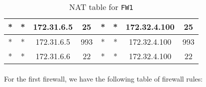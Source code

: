 \documentclass[a4paper, 11pt, oneside]{article}
\begin{document}
\begin{table}[H]
{\begin{tabular}{|cccc|cccc|}
    \multicolumn{1}{|c|}{*}                                      & \multicolumn{1}{c|}{*}                                           & \multicolumn{1}{c|}{172.31.6.5}                                  & 25                                                                    & \multicolumn{1}{c|}{*}                                      & \multicolumn{1}{c|}{*}                                           & \multicolumn{1}{c|}{{\color[HTML]{333333} 172.32.4.100}}         & 25                                                                    \\ \hline
    \multicolumn{1}{|c|}{*}                                      & \multicolumn{1}{c|}{*}                                           & \multicolumn{1}{c|}{172.31.6.5}                                  & {\color[HTML]{333333} 993}                                            & \multicolumn{1}{c|}{*}                                      & \multicolumn{1}{c|}{*}                                           & \multicolumn{1}{c|}{{\color[HTML]{333333} 172.32.4.100}}         & 993                                                                   \\ \hline
    \multicolumn{1}{|c|}{*}                                      & \multicolumn{1}{c|}{*}                                           & \multicolumn{1}{c|}{172.31.6.6}                                  & 22                                                                    & \multicolumn{1}{c|}{*}                                      & \multicolumn{1}{c|}{*}                                           & \multicolumn{1}{c|}{{\color[HTML]{333333} 172.32.4.100}}         & 22                                                                    \\ \hline
    \end{tabular}
    }
    \caption{NAT table for \texttt{FW1}}
\end{table}

\paragraph{}For the first firewall, we have the following table of firewall rules:
\end{document}
